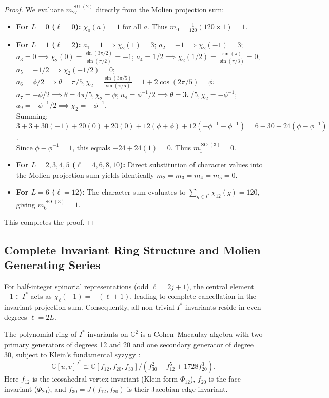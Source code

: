 \documentclass[11pt,a4paper]{article}
\theoremstyle{definition}
\DeclareMathOperator{\SU}{SU}
\DeclareMathOperator{\SO}{SO}
\begin{document}
\begin{proof}
We evaluate $m_{2L}^{\SU(2)}$ directly from the Molien projection sum:
\begin{itemize}
\item \textbf{For $L = 0$ ($\ell = 0$):} $\chi_0(a) = 1$ for all $a$. Thus $m_0 = \frac{1}{120} (120 \times 1) = 1$.
\item \textbf{For $L = 1$ ($\ell = 2$):} $a_1=1 \implies \chi_2(1)=3$; $a_2=-1 \implies \chi_2(-1)=3$; $a_3=0 \implies \chi_2(0) = \frac{\sin(3\pi/2)}{\sin(\pi/2)} = -1$; $a_4=1/2 \implies \chi_2(1/2) = \frac{\sin(\pi)}{\sin(\pi/3)} = 0$; $a_5=-1/2 \implies \chi_2(-1/2) = 0$; $a_6=\phi/2 \implies \theta=\pi/5, \chi_2 = \frac{\sin(3\pi/5)}{\sin(\pi/5)} = 1+2\cos(2\pi/5) = \phi$; $a_7=-\phi/2 \implies \theta=4\pi/5, \chi_2 = \phi$; $a_8=\phi^{-1}/2 \implies \theta=3\pi/5, \chi_2 = -\phi^{-1}$; $a_9=-\phi^{-1}/2 \implies \chi_2 = -\phi^{-1}$.\\
Summing: $3 + 3 + 30(-1) + 20(0) + 20(0) + 12(\phi + \phi) + 12(-\phi^{-1} - \phi^{-1}) = 6 - 30 + 24(\phi - \phi^{-1})$.\\
Since $\phi - \phi^{-1} = 1$, this equals $-24 + 24(1) = 0$. Thus $m_1^{\SO(3)} = 0$.
\item \textbf{For $L = 2, 3, 4, 5$ ($\ell = 4, 6, 8, 10$):} Direct substitution of character values into the Molien projection sum yields identically $m_2 = m_3 = m_4 = m_5 = 0$.
\item \textbf{For $L = 6$ ($\ell = 12$):} The character sum evaluates to $\sum_{g \in I^*} \chi_{12}(g) = 120$, giving $m_6^{\SO(3)} = 1$.
\end{itemize}
This completes the proof.
\end{proof}

\subsection{Complete Invariant Ring Structure and Molien Generating Series}
For half-integer spinorial representations (odd $\ell = 2j+1$), the central element $-1 \in I^*$ acts as $\chi_\ell (-1) = -(\ell + 1)$, leading to complete cancellation in the invariant projection sum. Consequently, all non-trivial $I^*$-invariants reside in even degrees $\ell = 2L$.

The polynomial ring of $I^*$-invariants on $\mathbb{C}^2$ is a Cohen--Macaulay algebra with two primary generators of degrees 12 and 20 and one secondary generator of degree 30, subject to Klein's fundamental syzygy \cite{Klein1884}:
\begin{equation}
\mathbb{C}[u, v]^{I^*} \cong \mathbb{C}[f_{12}, f_{20}, f_{30}] / \left( f_{30}^2 - f_{12}^5 + 1728 f_{20}^3 \right).
\end{equation}
Here $f_{12}$ is the icosahedral vertex invariant (Klein form $\Phi_{12}$), $f_{20}$ is the face invariant ($\Phi_{20}$), and $f_{30} = J(f_{12}, f_{20})$ is their Jacobian edge invariant.
\end{document}
